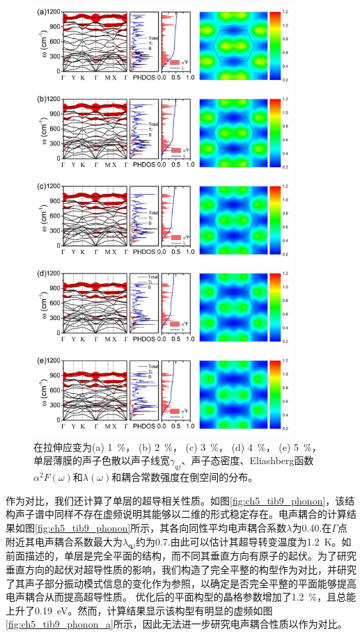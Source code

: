 \begin{figure}
  \includegraphics[width=0.88\textwidth]{figs/ch5_details_strains.png}
  \centering
  \caption{在拉伸应变为(a) \SI{1}{\percent}， (b) \SI{2}{\percent}， (c) \SI{3}{\percent}， (d) \SI{4}{\percent}， (e) \SI{5}{\percent}，单层薄膜的声子色散以声子线宽$\gamma_{qj}$、声子态密度、Eliashberg函数$\alpha^2 F(\omega)$和$\lambda(\omega)$和耦合常数强度在倒空间的分布。}
  \label{fig:ch5_details_strains}
\end{figure}

作为对比，我们还计算了单层的超导相关性质。如图\ref{fig:ch5_tib9_phonon}，该结构声子谱中同样不存在虚频说明其能够以二维的形式稳定存在。电声耦合的计算结果如图\ref{fig:ch5_tib9_phonon}所示，其各向同性平均电声耦合系数$\lambda$为0.40.在$\Gamma$点附近其电声耦合系数最大为$\lambda_{\bm{q}j}$约为0.7.由此可以估计其超导转变温度为\SI{1.2}{\kelvin}。如前面描述的，单层是完全平面的结构，而不同其垂直方向有原子的起伏。为了研究垂直方向的起伏对超导性质的影响，我们构造了完全平整的构型作为对比，并研究了其声子部分振动模式信息的变化作为参照，以确定是否完全平整的平面能够提高电声耦合从而提高超导性质。
优化后的平面构型的晶格参数增加了\SI{1.2}{\percent}，且总能上升了\SI{0.19}{\eV}。然而，计算结果显示该构型有明显的虚频如图\ref{fig:ch5_tib9_phonon_a}所示，因此无法进一步研究电声耦合性质以作为对比。

